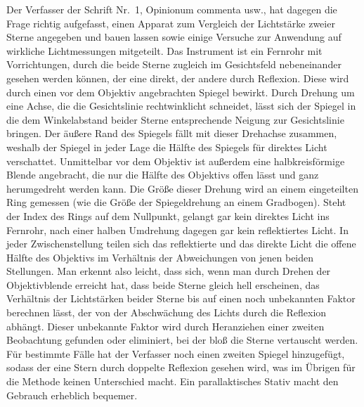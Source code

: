 Der Verfasser der Schrift Nr.~1, Opinionum commenta usw., hat dagegen die Frage richtig aufgefasst, einen Apparat zum Vergleich der Lichtstärke zweier Sterne angegeben und bauen lassen sowie einige Versuche zur Anwendung auf wirkliche Lichtmessungen mitgeteilt. Das Instrument ist ein Fernrohr mit Vorrichtungen, durch die beide Sterne zugleich im Gesichtsfeld nebeneinander gesehen werden können, der eine direkt, der andere durch Reflexion. Diese wird durch einen vor dem Objektiv angebrachten Spiegel bewirkt. Durch Drehung um eine Achse, die die Gesichtslinie rechtwinklicht schneidet, lässt sich der Spiegel in die dem Winkelabstand beider Sterne entsprechende Neigung zur Gesichtslinie bringen. Der äußere Rand des Spiegels fällt mit dieser Drehachse zusammen, weshalb der Spiegel in jeder Lage die Hälfte des Spiegels für direktes Licht verschattet. Unmittelbar vor dem Objektiv ist außerdem eine halbkreisförmige Blende angebracht, die nur die Hälfte des Objektivs offen lässt und ganz herumgedreht werden kann. Die Größe dieser Drehung wird an einem eingeteilten Ring gemessen (wie die Größe der Spiegeldrehung an einem Gradbogen). Steht der Index des Rings auf dem Nullpunkt, gelangt gar kein direktes Licht ins Fernrohr, nach einer halben Umdrehung dagegen gar kein reflektiertes Licht. In jeder Zwischenstellung teilen sich das reflektierte und das direkte Licht die offene Hälfte des Objektivs im Verhältnis der Abweichungen von jenen beiden Stellungen. Man erkennt also leicht, dass sich, wenn man durch Drehen der Objektivblende erreicht hat, dass beide Sterne gleich hell erscheinen, das Verhältnis der Lichtstärken beider Sterne bis auf einen noch unbekannten Faktor berechnen lässt, der von der Abschwächung des Lichts durch die Reflexion abhängt. Dieser unbekannte Faktor wird durch Heranziehen einer zweiten Beobachtung gefunden oder eliminiert, bei der bloß die Sterne vertauscht werden. Für bestimmte Fälle hat der Verfasser noch einen zweiten Spiegel hinzugefügt, sodass der eine Stern durch doppelte Reflexion gesehen wird, was im Übrigen für die Methode keinen Unterschied macht. Ein parallaktisches Stativ macht den Gebrauch erheblich bequemer.

